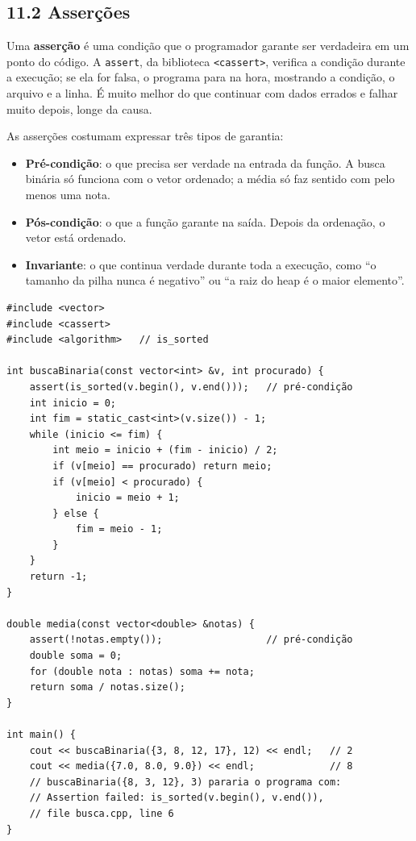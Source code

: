 \subsection{11.2 Asserções}

Uma \textbf{asserção} é uma condição que o programador garante ser verdadeira em um ponto do código. A \texttt{assert}, da biblioteca \texttt{<cassert>}, verifica a condição durante a execução; se ela for falsa, o programa para na hora, mostrando a condição, o arquivo e a linha. É muito melhor do que continuar com dados errados e falhar muito depois, longe da causa.

As asserções costumam expressar três tipos de garantia:

\begin{itemize}
  \item \textbf{Pré-condição}: o que precisa ser verdade na entrada da função. A busca binária só funciona com o vetor ordenado; a média só faz sentido com pelo menos uma nota.
  \item \textbf{Pós-condição}: o que a função garante na saída. Depois da ordenação, o vetor está ordenado.
  \item \textbf{Invariante}: o que continua verdade durante toda a execução, como ``o tamanho da pilha nunca é negativo'' ou ``a raiz do heap é o maior elemento''.
\end{itemize}

\begin{codigo}
\begin{Verbatim}[breaklines=true, breaksymbolleft={}, fontsize=\footnotesize]
#include <vector>
#include <cassert>
#include <algorithm>   // is_sorted

int buscaBinaria(const vector<int> &v, int procurado) {
    assert(is_sorted(v.begin(), v.end()));   // pré-condição
    int inicio = 0;
    int fim = static_cast<int>(v.size()) - 1;
    while (inicio <= fim) {
        int meio = inicio + (fim - inicio) / 2;
        if (v[meio] == procurado) return meio;
        if (v[meio] < procurado) {
            inicio = meio + 1;
        } else {
            fim = meio - 1;
        }
    }
    return -1;
}

double media(const vector<double> &notas) {
    assert(!notas.empty());                  // pré-condição
    double soma = 0;
    for (double nota : notas) soma += nota;
    return soma / notas.size();
}

int main() {
    cout << buscaBinaria({3, 8, 12, 17}, 12) << endl;   // 2
    cout << media({7.0, 8.0, 9.0}) << endl;             // 8
    // buscaBinaria({8, 3, 12}, 3) pararia o programa com:
    // Assertion failed: is_sorted(v.begin(), v.end()),
    // file busca.cpp, line 6
}
\end{Verbatim}
\end{codigo}

